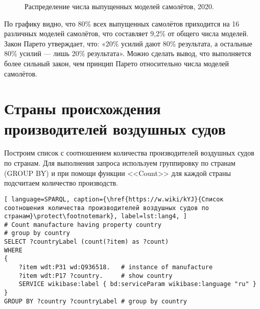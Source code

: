 \begin{figure*}[h]

    \setlength{\fboxsep}{0pt}%
    \setlength{\fboxrule}{1pt}%

	\caption{Распределение числа выпущенных моделей самолётов, 2020.}%
    \label{fig:Pareto_principle_diargam}%
\end{figure*}

По графику видно, что 80\% всех выпущенных самолётов приходится на 16 различных моделей самолётов, что составляет 9,2\% от общего числа моделей. Закон Парето утверждает, что: «20\% усилий дают 80\% результата, а остальные 80\% усилий — лишь 20\% результата». Можно сделать вывод, что выполняется более сильный закон, чем принцип Парето относительно числа моделей самолётов.


\section{Страны происхождения производителей воздушных судов}

Построим список с соотношением количества производителей воздушных судов по странам. Для выполнения запроса используем группировку по странам (GROUP BY) и при помощи функции <<Count>> для каждой страны подсчитаем количество производств.

\label{aircraft_question_3}

\begin{lstlisting}[ language=SPARQL, caption={\href{https://w.wiki/kYJ}{Список соотношения количества производителей воздушных судов по странам}\protect\footnotemark}, label=lst:lang4, ]
# Count manufacture having property country
# group by country
SELECT ?countryLabel (count(?item) as ?count)
WHERE
{
    ?item wdt:P31 wd:Q936518.   # instance of manufacture
    ?item wdt:P17 ?country.     # show country
    SERVICE wikibase:label { bd:serviceParam wikibase:language "ru" }
}
GROUP BY ?country ?countryLabel # group by country
\end{lstlisting}

